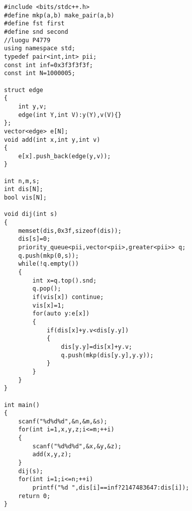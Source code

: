 \begin{lstlisting}
#include <bits/stdc++.h>
#define mkp(a,b) make_pair(a,b)
#define fst first
#define snd second
//luogu P4779
using namespace std;
typedef pair<int,int> pii;
const int inf=0x3f3f3f3f;
const int N=1000005;

struct edge
{
	int y,v;
	edge(int Y,int V):y(Y),v(V){}
};
vector<edge> e[N];
void add(int x,int y,int v)
{
	e[x].push_back(edge(y,v));
}

int n,m,s;
int dis[N];
bool vis[N];

void dij(int s)
{
	memset(dis,0x3f,sizeof(dis));
	dis[s]=0;
	priority_queue<pii,vector<pii>,greater<pii>> q;
	q.push(mkp(0,s));
	while(!q.empty())
	{
		int x=q.top().snd;
		q.pop();
		if(vis[x]) continue;
		vis[x]=1;
		for(auto y:e[x])
		{
			if(dis[x]+y.v<dis[y.y])
			{
				dis[y.y]=dis[x]+y.v;
				q.push(mkp(dis[y.y],y.y));
			}
		}
	}
}

int main()
{
	scanf("%d%d%d",&n,&m,&s);
	for(int i=1,x,y,z;i<=m;++i)
	{
		scanf("%d%d%d",&x,&y,&z);
		add(x,y,z);
	}
	dij(s);
	for(int i=1;i<=n;++i)
		printf("%d ",dis[i]==inf?2147483647:dis[i]);
	return 0;
}
\end{lstlisting}